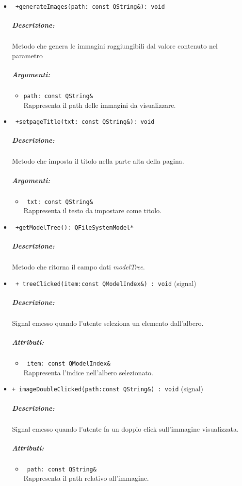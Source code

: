 \begin{itemize}
\item\color{blue}\verb! +generateImages(path: const QString&): void!
\color{black}
\subparagraph{Descrizione:} Metodo che genera le immagini raggiungibili dal valore contenuto nel parametro
\subparagraph{Argomenti:}
\begin{itemize}
\item \color{RoyalPurple} \verb!path: const QString& ! \\ Rappresenta il path delle immagini da visualizzare.
\end{itemize}
 
\item\color{blue}\verb! +setpageTitle(txt: const QString&): void!
\color{black}
\subparagraph{Descrizione:} Metodo che imposta il titolo nella parte alta della pagina.
\subparagraph{Argomenti:}
\begin{itemize}
\item \color{RoyalPurple} \verb! txt: const QString& ! \\ Rappresenta il testo da impostare come titolo.
\end{itemize}
 
\item\color{blue}\verb! +getModelTree(): QFileSystemModel*!
\color{black}
\subparagraph{Descrizione:} Metodo che ritorna il campo dati \emph{modelTree}.
\item\color{blue}\verb! + treeClicked(item:const QModelIndex&) : void! (signal)
\color{black} 
\subparagraph{Descrizione:} 
Signal\g{} emesso quando l'utente seleziona un elemento dall'albero.
\subparagraph{Attributi:}
\begin{itemize}
\item \color{RoyalPurple}\verb! item: const QModelIndex& ! \\ Rappresenta l'indice nell'albero selezionato.
\end{itemize}

\item\color{blue}\verb!+ imageDoubleClicked(path:const QString&) : void! (signal)
\color{black} 
\subparagraph{Descrizione:} 
Signal\g{} emesso quando l'utente fa un doppio click sull'immagine visualizzata.
\subparagraph{Attributi:}
\begin{itemize}
\item \color{RoyalPurple}\verb! path: const QString& ! \\ Rappresenta il path relativo all'immagine.
\end{itemize}
 
\end{itemize}
\pagebreak
\color{black}
